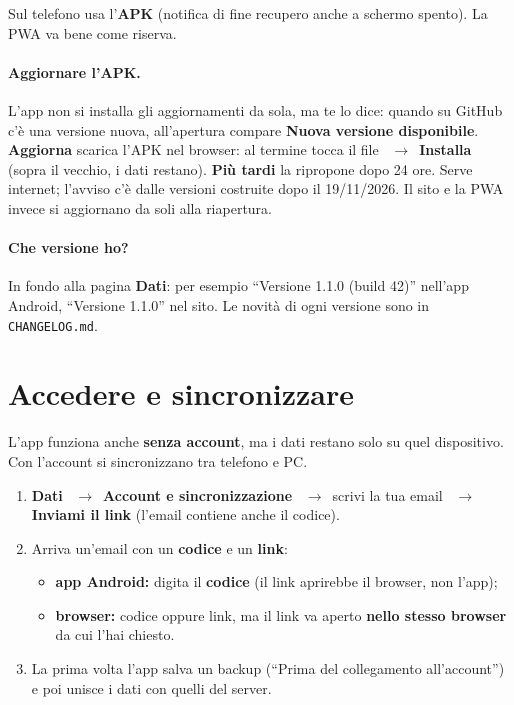 \documentclass[11pt,a4paper]{article}
\newcommand{\ra}{\unskip\nobreak\ $\rightarrow$\ \ignorespaces}            %
\newcommand{\bt}[1]{\textbf{#1}}               %
\newcommand{\code}[1]{\texttt{#1}}             %
\begin{document}
\begin{consiglio}
Sul telefono usa l'\bt{APK} (notifica di fine recupero anche a schermo spento). La PWA va bene come riserva.
\end{consiglio}

\paragraph{Aggiornare l'APK.} L'app non si installa gli aggiornamenti da sola, ma te lo dice:
quando su GitHub c'è una versione nuova, all'apertura compare \bt{Nuova versione disponibile}.
\bt{Aggiorna} scarica l'APK nel browser: al termine tocca il file \ra \bt{Installa} (sopra il
vecchio, i dati restano). \bt{Più tardi} la ripropone dopo 24 ore. Serve internet; l'avviso c'è
dalle versioni costruite dopo il 19/11/2026.
Il sito e la PWA invece si aggiornano da soli alla riapertura.

\paragraph{Che versione ho?} In fondo alla pagina \bt{Dati}: per esempio ``Versione 1.1.0 (build 42)''
nell'app Android, ``Versione 1.1.0'' nel sito. Le novità di ogni versione sono in \code{CHANGELOG.md}.

\section{Accedere e sincronizzare}\label{sec:accedere}

L'app funziona anche \bt{senza account}, ma i dati restano solo su quel dispositivo.
Con l'account si sincronizzano tra telefono e PC.

\begin{enumerate}
  \item \bt{Dati} \ra \bt{Account e sincronizzazione} \ra scrivi la tua email \ra
        \bt{Inviami il link} (l'email contiene anche il codice).
  \item Arriva un'email con un \bt{codice} e un \bt{link}:
    \begin{itemize}
      \item \bt{app Android:} digita il \bt{codice} (il link aprirebbe il browser, non l'app);
      \item \bt{browser:} codice oppure link, ma il link va aperto \bt{nello stesso browser}
            da cui l'hai chiesto.
    \end{itemize}
  \item La prima volta l'app salva un backup (``Prima del collegamento all'account'') e poi
        unisce i dati con quelli del server.
\end{enumerate}
\end{document}
